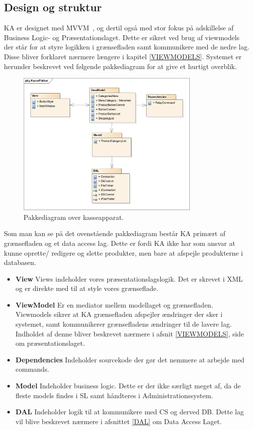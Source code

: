 \subsection{Design og struktur}
\gls{KA} er designet med MVVM~\cite{MVVM}, og dertil også med stor fokus på adskillelse af Business Logic- og Præsentationslaget. Dette er sikret ved brug af viewmodels der står for at styre logikken i grænsefladen samt kommunikere med de nedre lag. Disse bliver forklaret nærmere længere i kapitel \ref{VIEWMODELS}.
Systemet er herunder beskrevet ved følgende pakkediagram for at give et hurtigt overblik.	

\begin{figure}[H]
	\centering
	\includegraphics[width=0.8\textwidth]{Systemdesign/Frontend/pics/KassePakker}
	\caption{Pakkediagram over kasseapparat.}
	\label{fig:EndeligeGUI}
\end{figure}

Som man kan se på det ovenstående pakkediagram består \gls{KA} primært af grænsefladen og et data access lag. Dette er fordi \gls{KA} ikke har som ansvar at kunne oprette/ redigere og slette produkter, men bare at afspejle produkterne i databasen. 

\begin{itemize}
	\item \textbf{View} Views indeholder vores præsentationslagslogik. Det er skrevet i XML og er direkte med til at style vores grænseflade.
	\item \textbf{ViewModel} Er en mediator mellem modellaget og grænsefladen. Viewmodels sikrer at \gls{KA} grænsefladen afspejler ændringer der sker i systemet, samt kommunikerer grænsefladens ændringer til de lavere lag. Indholdet af denne bliver beskrevet nærmere i afsnit \ref{VIEWMODELS}, side \pageref{VIEWMODELS} om præsentationslaget.
	\item \textbf{Dependencies} Indeholder sourcekode der gør det nemmere at arbejde med commands.
	\item \textbf{Model} Indeholder business logic. Dette er der ikke særligt meget af, da de fleste models findes i \gls{SL} samt håndteres i Administrationssystem.
	\item \textbf{DAL} Indeholder logik til at kommunikere med \gls{CS} og derved \gls{DB}. Dette lag vil blive beskrevet nærmere i afsnittet \ref{DAL} om Data Access Laget.
\end{itemize}



